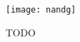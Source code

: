\begin{figure}[t]
\begin{center}
\texttt{[image: nandg]}
\caption{
TODO
}
\label{fig:nandg}
\end{center}
\end{figure}
